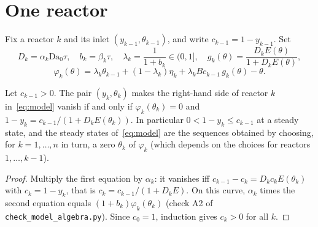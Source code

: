 \documentclass[11pt,a4paper]{report}
\newcommand*{\Da}{\mathrm{Da}_0}
\begin{document}
\section{One reactor}\label{sec:one}

Fix a reactor \(k\) and its inlet \((y_{k-1},\theta_{k-1})\), and write \(c_{k-1}=1-y_{k-1}\). Set
\begin{equation}\label{eq:reduced}
D_k=\alpha_k\Da\tau,\quad b_k=\beta_k\tau,\quad \lambda_k=\frac1{1+b_k}\in(0,1],\quad
g_k(\theta)=\frac{D_kE(\theta)}{1+D_kE(\theta)},
\end{equation}
\begin{equation}\label{eq:phi}
\varphi_k(\theta)=\lambda_k\theta_{k-1}+(1-\lambda_k)\eta_k+\lambda_kBc_{k-1}\,g_k(\theta)-\theta .
\end{equation}

\begin{lemma}[note={reduction}]\label{lem:reduction}
Let \(c_{k-1}>0\). The pair \((y_k,\theta_k)\) makes the right-hand side of reactor \(k\) in~\eqref{eq:model} vanish
if and only if \(\varphi_k(\theta_k)=0\) and \(1-y_k=c_{k-1}/(1+D_kE(\theta_k))\). In particular \(0<1-y_k\le c_{k-1}\)
at a steady state, and the steady states of~\eqref{eq:model} are the sequences obtained by choosing, for
\(k=1,\dots,n\) in turn, a zero \(\theta_k\) of \(\varphi_k\) (which depends on the choices for reactors \(1,\dots,k-1\)).
\end{lemma}
\begin{proof}
Multiply the first equation by \(\alpha_k\): it vanishes iff \(c_{k-1}-c_k=D_kc_kE(\theta_k)\) with \(c_k=1-y_k\), that
is \(c_k=c_{k-1}/(1+D_kE)\). On this curve, \(\alpha_k\) times the second equation equals \((1+b_k)\varphi_k(\theta_k)\)
(check A2 of \texttt{check\_model\_algebra.py}). Since \(c_0=1\), induction gives \(c_k>0\) for all \(k\).
\end{proof}
\end{document}
